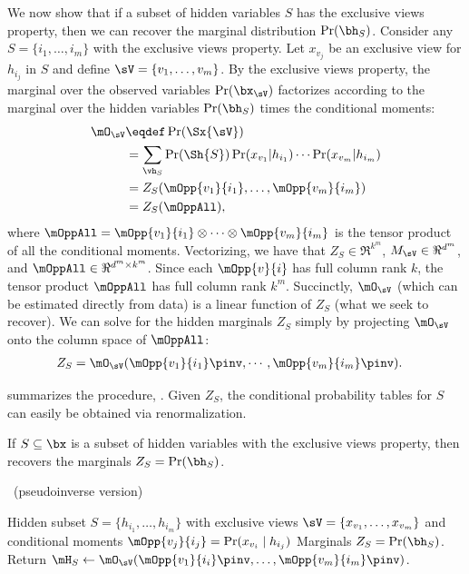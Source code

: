 We now show that if a subset of hidden variables $S$ has the exclusive views property,
then we can recover the marginal distribution $\Pr(\bh_S)$.
Consider any $S = \{i_1, \ldots, i_m\}$ with the exclusive views property. Let
  $x_{v_j}$ be an exclusive view for $h_{i_j}$ in $S$ and define $\sV
  = \{v_1, \ldots, v_m\}$. %
By the exclusive views property,
the marginal over the observed variables $\Pr(\bx_\sV)$
factorizes according to the marginal over the hidden variables $\Pr(\bh_S)$
times the conditional moments:
\begin{align*}
  \mO_\sV 
  &\eqdef \Pr(\Sx{\sV}) \\
  &= \sum_{\vh_S} \Pr(\Sh{S}) 
                    \Pr(x_{v_1} | h_{i_1}) \cdots \Pr(x_{v_m} | h_{i_m}) \\
  &= Z_{S}(\mOpp{v_1}{i_1},\dots,\mOpp{v_m}{i_m}) \\
  &= Z_{S}(\mOppAll),
\end{align*}
where $\mOppAll = \mOpp{v_1}{i_1} \otimes \cdots \otimes \mOpp{v_m}{i_m}$ is the tensor product of
all the conditional moments.
Vectorizing, we have that
$Z_S \in \Re^{k^m}$,
$M_\sV \in \Re^{d^m}$,
and $\mOppAll \in \Re^{d^m \times k^m}$.
Since each $\mOpp{v}{i}$ has full column rank $k$,
the tensor product $\mOppAll$ has full column rank $k^m$.
Succinctly, $\mO_\sV$ (which can be estimated directly from data)
is a linear function of $Z_S$ (what we seek to recover).
We can solve for the hidden marginals $Z_S$ simply by projecting $\mO_\sV$ onto the column
space of $\mOppAll$:
\begin{align*}
  Z_{S} &= \mO_\sV(\mOpp{v_1}{i_1}\pinv,\cdots,\mOpp{v_m}{i_m}\pinv).
\end{align*}

 summarizes the procedure, \LearnMarginals.
Given $Z_S$, the conditional probability tables for $S$ can easily be
obtained via renormalization.
\begin{theorem}
If $S \subseteq \bx$ is a subset of hidden variables with the exclusive views property,
then  recovers the marginals $Z_S = \Pr(\bh_S)$.
\end{theorem}

\begin{algorithm}
  \caption{\LearnMarginals~(pseudoinverse version)}
  \label{algo:learnMarginals}
  \begin{algorithmic}
    \REQUIRE Hidden subset $S = \{ h_{i_1}, \dots, h_{i_m} \}$ with exclusive views $\sV = \{ x_{v_1}, \dots, x_{v_m} \}$
    and conditional moments $\mOpp{v_j}{i_j} = \Pr(x_{v_i} \mid h_{i_j})$
    \ENSURE Marginals $Z_S = \Pr(\bh_S)$.
      \STATE Return $\mH_S \gets \mO_{\sV}( \mOpp{v_1}{i_i}\pinv, \dots, {\mOpp{v_m}{i_m}}\pinv )$.
  \end{algorithmic}
\end{algorithm}

